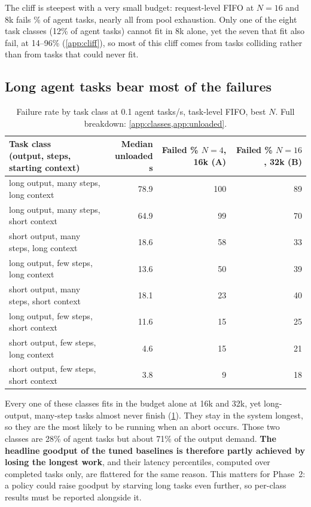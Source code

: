 The cliff is steepest with a very small budget: request-level FIFO at $N=16$ and 8k fails \% of agent tasks, nearly all from pool exhaustion. Only one of the eight task classes (12\% of agent tasks) cannot fit in 8k alone, yet the seven that fit also fail, at 14--96\% (\cref{app:cliff}), so most of this cliff comes from tasks colliding rather than from tasks that could never fit.

\subsection{Long agent tasks bear most of the failures}\label{sec:classes}

\begin{table}[t]
  \centering\small
  \begin{tabular}{lrrr}
    \toprule
    \makecell[l]{Task class\\(output, steps, starting context)} & \makecell{Median\\unloaded s} & \makecell{Failed \%\\$N=4$, 16k (A)} & \makecell{Failed \%\\$N=16$, 32k (B)} \\
    \midrule
    long output, many steps, long context   & 78.9 & 100 & 89 \\
    long output, many steps, short context  & 64.9 & 99  & 70 \\
    short output, many steps, long context  & 18.6 & 58  & 33 \\
    long output, few steps, long context    & 13.6 & 50  & 39 \\
    short output, many steps, short context & 18.1 & 23  & 40 \\
    long output, few steps, short context   & 11.6 & 15  & 25 \\
    short output, few steps, long context   & 4.6  & 15  & 21 \\
    short output, few steps, short context  & 3.8  & 9   & 18 \\
    \bottomrule
  \end{tabular}
  \caption{Failure rate by task class at 0.1 agent tasks/s, task-level FIFO, best $N$. Full breakdown: \cref{app:classes,app:unloaded}.}
  \label{tab:classes}
\end{table}

Every one of these classes fits in the budget alone at 16k and 32k, yet long-output, many-step tasks almost never finish (\cref{tab:classes}). They stay in the system longest, so they are the most likely to be running when an abort occurs. Those two classes are 28\% of agent tasks but about 71\% of the output demand. \textbf{The headline goodput of the tuned baselines is therefore partly achieved by losing the longest work}, and their latency percentiles, computed over completed tasks only, are flattered for the same reason. This matters for Phase~2: a policy could raise goodput by starving long tasks even further, so per-class results must be reported alongside it.

